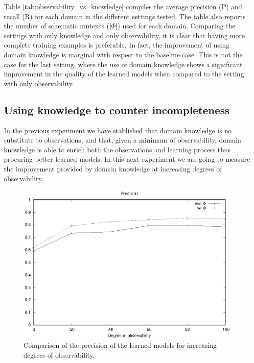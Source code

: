 \documentclass{article}
\begin{document}
Table \ref{tab:observability_vs_knowledge} compiles the average precision (P) and recall (R) for each domain in the different settings tested. The table also reports the number of schematic mutexes ($|\Phi|$) used for each domain. Comparing the settings wtih only knowledge and only observability, it is clear that having more complete training examples is preferable. In fact, the improvement of using domain knowledge is marginal with respect to the baseline case. This is not the case for the last setting, where the use of domain knowledge shows a significant improvement in the quality of the learned models when compared to the setting with only observability. 

\subsection{Using knowledge to counter incompleteness}
In the previous experiment we have stablished that domain knowledge is no substitute to observations, and that, given a minimum of observability, domain knowledge is able to enrich both the observations and learning process thus procuring better learned models. In this next experiment we are going to measure the improvement provided by domain knowledge at increasing degrees of observability.

\begin{figure}[hbt!]
	\centering
	\includegraphics[width=\linewidth]{figures/comparison_precision.eps}
	\caption{Comparison of the precision of the learned models for increasing degrees of observability.}
	\label{fig:comparison_precision}
\end{figure}
\end{document}
